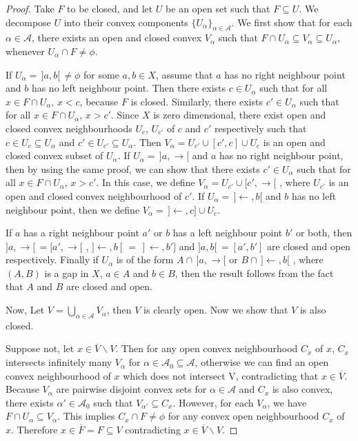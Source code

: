 \documentclass[12pt,oneside,english]{amsbook}
\numberwithin{equation}{section} %
\numberwithin{figure}{section} %
\theoremstyle{plain}
\numberwithin{section}{chapter}
\theoremstyle{plain}
\begin{document}
\begin{proof}
  Take $F$ to be closed, and let $U$ be an open set such that $F \subseteq U$. We decompose $U$ into their convex components $\{U_{\alpha}\}_{\alpha \in \mathcal{A}} $. We first show that for each $\alpha \in \mathcal{A}$, there exists an open and closed convex $V_{\alpha}$ such that $F \cap U_{\alpha} \subseteq V_{\alpha} \subseteq U_{\alpha}$, whenever $U_{\alpha} \cap F \neq \phi$.

  If $U_{\alpha} = \,]a,b[ \, \neq \phi$ for some $a,b \in X$, assume that $a$ has no right neighbour point and $b$ has no left neighbour point. Then there exists $c \in U_{\alpha}$ such that for all $x \in F \cap U_{\alpha}$, $x < c$, because $F$ is closed.  Similarly, there exists $c' \in U_{\alpha}$ such that for all $x \in F \cap U_{\alpha}$, $x > c'$. Since $X$ is zero dimensional, there exist open and closed convex neighbourhoods $U_c$, $U_{c'}$ of $c$ and $c'$ respectively such that $c \in U_c \subseteq U_{\alpha}$ and $c' \in U_{c'} \subseteq U_{\alpha}$. Then $V_{\alpha} = U_{c'} \cup  [c',c] \cup U_c$ is an open and closed convex subset of $U_{\alpha}$. If $U_{\alpha} = \, ]a,\rightarrow[$ and $a$ has no right neighbour point, then by using the same proof, we can show that there exists $c' \in U_{\alpha}$ such that for all $x \in F \cap U_{\alpha}$, $x > c'$. In this case, we define $V_{\alpha} = U_{c'} \cup [c',\rightarrow[$ , where $U_{c'}$ is an open and closed convex neighbourhood of $c'$. If $U_{\alpha} = \, ]\leftarrow, b[$ and $b$ has no left neighbour point, then we define  $V_{\alpha} = \,] \leftarrow, c] \cup U_c$. 

  If $a$ has a right neighbour point $a'$ or $b$ has a left neighbour point $b'$ or both, then $]a, \rightarrow[ \, = [a', \rightarrow[$ , $]\leftarrow, b[ \, = \, ]\leftarrow, b']$ and $]a,b[ \, = [a',b']$ are closed and open respectively.  Finally if $U_{\alpha}$ is of the form $A \cap \, ]a, \rightarrow[$ or $B \cap \, ]\leftarrow,b[$ , where $(A,B)$ is a gap in $X$, $a \in A$ and $b \in B$, then the result follows from the fact that $A$ and $B$ are closed and open. 

  Now, Let $V = \bigcup_{\alpha \in \mathcal{A}}V_{\alpha}$, then $V$ is clearly open. Now we show that $V$ is also closed.

  Suppose not, let $x \in \overline{V} \backslash V$. Then for any open convex neighbourhood $C_x$ of $x$, $C_x$ intersects infinitely many $V_{\alpha}$ for $\alpha \in \mathcal{A}_0 \subseteq \mathcal{A}$, otherwise we can find an open convex neighbourhood of $x$ which does not intersect V, contradicting that $x \in \overline{V}$. Because $V_{\alpha}$ are pairwise disjoint convex sets for $\alpha \in \mathcal{A}$ and $C_x$ is also convex, there exists $\alpha' \in \mathcal{A}_0$ such that $V_{\alpha'} \subseteq C_x$. However, for each $V_{\alpha}$, we have $F \cap U_{\alpha} \subseteq V_{\alpha}$. This implies $C_x \cap F \neq \phi$ for any convex open neighbourhood $C_x$ of $x$. Therefore $x \in \overline{F} = F \subseteq V$ contradicting $x \in \overline{V} \backslash V$.


\end{proof}
\end{document}
